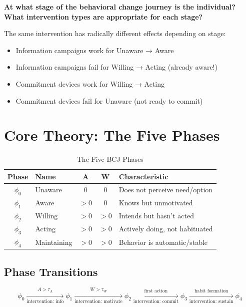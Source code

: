 \begin{tcolorbox}[colback=red!5!white, colframe=red!75!black,
    title=The Fundamental Question]
\textbf{At what stage of the behavioral change journey is the individual?
What intervention types are appropriate for each stage?}
\end{tcolorbox}

The same intervention has radically different effects depending on stage:
\begin{itemize}
\item Information campaigns work for Unaware → Aware
\item Information campaigns fail for Willing → Acting (already aware!)
\item Commitment devices work for Willing → Acting
\item Commitment devices fail for Unaware (not ready to commit)
\end{itemize}

\section{Core Theory: The Five Phases}
\label{sec:stage-phases}

\begin{table}[htbp]
\centering
\caption{The Five BCJ Phases}
\label{tab:stage-phases}
\renewcommand{\arraystretch}{1.4}
\begin{tabular}{@{}clccp{4cm}@{}}
\toprule
\textbf{Phase} & \textbf{Name} & \textbf{A} & \textbf{W} & \textbf{Characteristic} \\
\midrule
$\phi_0$ & Unaware & 0 & 0 & Does not perceive need/option \\
$\phi_1$ & Aware & $>0$ & 0 & Knows but unmotivated \\
$\phi_2$ & Willing & $>0$ & $>0$ & Intends but hasn't acted \\
$\phi_3$ & Acting & $>0$ & $>0$ & Actively doing, not habituated \\
$\phi_4$ & Maintaining & $>0$ & $>0$ & Behavior is automatic/stable \\
\bottomrule
\end{tabular}
\end{table}

\subsection{Phase Transitions}

\begin{equation}
\phi_0 \xrightarrow[\text{intervention: info}]{A > \tau_A} \phi_1
\xrightarrow[\text{intervention: motivate}]{W > \tau_W} \phi_2
\xrightarrow[\text{intervention: commit}]{\text{first action}} \phi_3
\xrightarrow[\text{intervention: sustain}]{\text{habit formation}} \phi_4
\end{equation}

